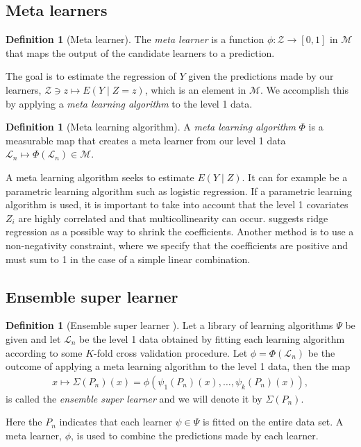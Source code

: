 \documentclass[11pt, a4paper]{article}
\theoremstyle{definition}
\newtheorem{definition}[theorem]{Definition}
\theoremstyle{remark}
\newcommand{\la}{\psi}
\newcommand{\lib}{\Psi}
\newcommand{\lone}{\mathcal{L}}
\newcommand{\meta}{\phi}
\newcommand{\Meta}{\Phi}
\newcommand{\esl}{\Sigma}
\begin{document}
\subsection{Meta learners}
\begin{definition}[Meta learner]
    The \textit{meta learner} is a function $ \meta: \mathcal{Z} \to [0,1] $ in $ \mathcal{M} $ that maps the output of the candidate learners to a prediction. 
\end{definition}
The goal is to estimate the regression of $ Y $ given the predictions made by our learners, $ \mathcal{Z} \ni z \mapsto E(Y \mid Z = z) $, which is an element in $ \mathcal{M} $. We accomplish this by applying a \textit{meta learning algorithm} to the level 1 data. 
\begin{definition}[Meta learning algorithm]
    A \textit{meta learning algorithm} $ \Meta $ is a measurable map that creates a meta learner from our level 1 data $ \lone_{n} \mapsto \Meta(\lone_{n}) \in \mathcal{M} $. 
\end{definition}
A meta learning algorithm seeks to estimate $ E (Y \mid Z) $. It can for example be a parametric learning algorithm such as logistic regression. If a parametric learning algorithm is used, it is important to take into account that the level 1 covariates $ Z_i $ are highly correlated and that multicollinearity can occur. \cite{breiman1996stacked} suggests ridge regression as a possible way to shrink the coefficients. Another method is to use a non-negativity constraint, where we specify that the coefficients are positive and must sum to 1 in the case of a simple linear combination. 

\subsection{Ensemble super learner}
\begin{definition}[Ensemble super learner \parencite{van2007super}]
    Let a library of learning algorithms $ \lib $ be given and let $ \lone_{n} $ be the level 1 data obtained by fitting each learning algorithm according to some $ K $-fold cross validation procedure. Let $ \meta = \Meta(\lone_{n}) $ be the outcome of applying a meta learning algorithm to the level 1 data, then the map 
    \begin{align*}
       x \mapsto \esl(P_n)(x) = \meta(\la_1(P_{n})(x), \ldots, \la_k(P_{n})(x) ),
    \end{align*}
    is called the \textit{ensemble super learner} and we will denote it by $ \esl(P_{n}) $. 
\end{definition}
Here the $ P_n $ indicates that each learner $ \la \in \lib $ is fitted on the entire data set. A meta learner, $ \meta $, is used to combine the predictions made by each learner. 
\end{document}

